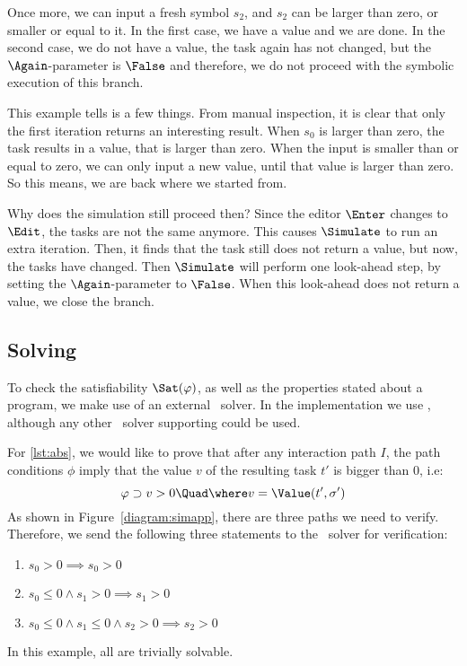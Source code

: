 Once more, we can input a fresh symbol $s_2$, and $s_2$ can be larger than zero, or smaller or equal to it.
In the first case, we have a value and we are done.
In the second case, we do not have a value, the task again has not changed, but the $\Again$-parameter is $\False$ and therefore, we do not proceed with the symbolic execution of this branch.

\separate
This example tells is a few things.
From manual inspection, it is clear that only the first iteration returns an interesting result.
When $s_0$ is larger than zero, the task results in a value, that is larger than zero.
When the input is smaller than or equal to zero, we can only input a new value, until that value is larger than zero.
So this means, we are back where we started from.

Why does the simulation still proceed then?
Since the editor $\Enter$ changes to $\Edit$, the tasks are not the same anymore.
This causes $\Simulate$ to run an extra iteration.
Then, it finds that the task still does not return a value, but now, the tasks have changed.
Then $\Simulate$ will perform one look-ahead step, by setting the $\Again$-parameter to $\False$.
When this look-ahead does not return a value, we close the branch.



\subsection{Solving}

To check the satisfiability $\Sat(\phi)$, as well as the properties stated about a program,
we make use of an external \SMT~solver.
In the implementation we use \ZTHREE,
although any other \SMT~solver supporting \SMTLIB could be used.

For \cref{lst:abs}, we would like to prove that after any interaction path $I$,
the path conditions $\phi$ imply that the value $v$ of the resulting task $t'$ is bigger than $0$, i.e:
\begin{equation*}
  \phi \implies v  > 0 \Quad \where v = \Value(t',\sigma')
\end{equation*}
As shown in Figure~\ref{diagram:simapp}, there are three paths we need to verify.
Therefore, we send the following three statements to the \SMT~solver for verification:
\begin{enumerate}
  \item $s_0 > 0                                   \implies s_0 > 0  $
  \item $s_0 \leq 0 \land s_1 > 0                  \implies s_1 > 0  $
  \item $s_0 \leq 0 \land s_1 \leq 0 \land s_2 > 0 \implies s_2 > 0  $
\end{enumerate}
In this example, all are trivially solvable.



